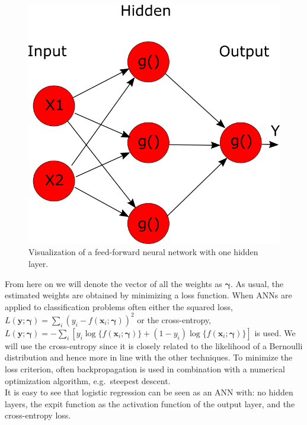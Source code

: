 \begin{figure}[!htb]
\centering
\includegraphics[scale=0.3]{VectorGraphics/ANN.png}
\caption{\label{fig:chClassificationTechniques:ANN}Visualization of a feed-forward neural network with one hidden layer.}
\end{figure}

From here on we will denote the vector of all the weights as $\bm{\gamma}$. As usual, the estimated weights are obtained by minimizing a loss function. When ANNs are applied to classification problems often either the squared loss, $L(\bm{y};\bm{\gamma}) = \sum_i (y_i - f(\bm{x}_i;\bm{\gamma}))^2$ or the cross-entropy, $L(\bm{y};\bm{\gamma}) = - \sum_i \left[ y_i \log \{ f(\bm{x}_i;\bm{\gamma})\} + (1-y_i)\log \{f(\bm{x}_i;\bm{\gamma})\}\right]$ is used. We will use the cross-entropy since it is closely related to the likelihood of a Bernoulli distribution and hence more in line with the other techniques. To minimize the loss criterion, often backpropagation \parencite{rumelhart_learning_1986} is used in combination with a numerical optimization algorithm, e.g.\ steepest descent. \\

It is easy to see that logistic regression can be seen as an ANN with: no hidden layers, the expit function as the activation function of the output layer, and the cross-entropy loss.\\

